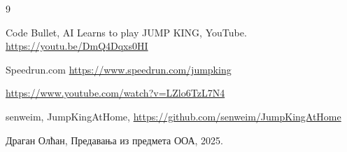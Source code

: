 \documentclass{article}
\begin{document}
\begin{thebibliography}{9}

    Code Bullet,
     AI Learns to play JUMP KING,
     YouTube. \url{https://youtu.be/DmQ4Dqxs0HI}

    Speedrun.com
    \url{https://www.speedrun.com/jumpking}

    \url{https://www.youtube.com/watch?v=LZlo6TzL7N4}

    senweim,
    JumpKingAtHome,
    \url{https://github.com/senweim/JumpKingAtHome}

    Драган Олћан,
    Предавања из предмета ООА,
    2025.






\end{thebibliography}
\end{document}
